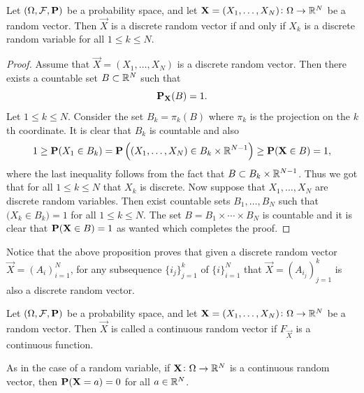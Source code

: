 \documentclass[11pt,a4paper]{article}
\begin{document}
\begin{proposition}
  Let $(\Omega, \mathcal F, \mathbf{P})$ be a probability space, 
  and let $\boldsymbol{\mathbf{X}} = (X_1,\dots,X_N) \colon \Omega \to \mathbb{R}^N$ be a random vector.
  Then $\vec{X}$ is a discrete random vector if and only if $X_k$ is a discrete
  random variable for all $1 \le k \le N$.
\end{proposition}
\begin{proof}
  Assume that $\vec{X} = (X_1,\dots,X_N)$ is a discrete random vector.
  Then there exists a countable set $B \subset \mathbb{R}^N$ such that
  \[
    \mathbf{P}_{\boldsymbol{\mathbf{X}}}(B) = 1.
  \]
  Let $1 \le k \le N$. Consider the set $B_k = \pi_k(B)$ where $\pi_k$ is the
  projection on the $k$th coordinate. It is clear that $B_k$ is countable
  and also
  \[
    1 \geq
    \mathbf{P}(X_1 \in B_k) =
    \mathbf{P}\left((X_1,\dots,X_N) \in B_k \times \mathbb{R}^{N-1}\right) \geq
    \mathbf{P}(\boldsymbol{\mathbf{X}} \in B) =
    1,
  \]
  where the last inequality follows from the fact
  that $B \subset B_k \times \mathbb{R}^{N-1}$.
  Thus we got that for all $1 \le k \le N$ that $X_k$ is discrete.
  Now suppose that $X_1,\dots,X_N$ are discrete random variables.
  Then exist countable sets $B_1,\dots,B_N$ such that 
  $\mathbf (X_k \in B_k) = 1$ for all $1 \le k \le N$.
  The set $B = B_1 \times \cdots \times B_N$ is countable and it is clear that
  $\mathbf{P}(\boldsymbol{\mathbf{X}} \in B) = 1$ as wanted which completes the proof.
\end{proof}

\begin{remark}
  Notice that the above proposition proves that given a discrete random
  vector $\vec{X} = (A_i)_{i=1}^{N}$, for any subsequence $\{i_j\}_{j=1}^{k}$ of 
  $\{i\}_{i=1}^N$ that $\vec{X} = (A_{i_j})_{j=1}^k$ is also a discrete random
  vector.
\end{remark}

\begin{definition}
  Let $(\Omega, \mathcal F, \mathbf{P})$ be a probability space, 
  and let $\boldsymbol{\mathbf{X}} = (X_1,\dots,X_N) \colon \Omega \to \mathbb{R}^N$ be a random vector.
  Then $\vec{X}$ is called a continuous random vector if 
  $F_{\vec{X}}$ is a continuous function.
\end{definition}

\begin{remark}
  As in the case of a random variable, if $\boldsymbol{\mathbf{X}} \colon \Omega \to \mathbb{R}^N$ is
  a continuous random vector, 
  then $\mathbf{P}(\boldsymbol{\mathbf{X}} = a) = 0$ for all $a \in \mathbb{R}^N$.
\end{remark}
\end{document}
